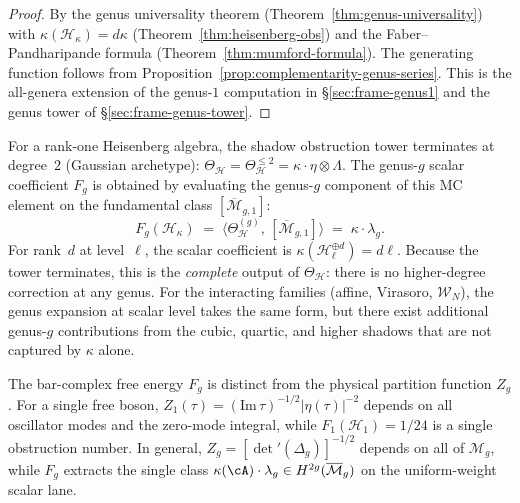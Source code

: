 \begin{proof}
By the genus universality theorem
(Theorem~\ref{thm:genus-universality}) with
$\kappa(\mathcal{H}_\kappa) = d\kappa$
(Theorem~\ref{thm:heisenberg-obs}) and
the Faber--Pandharipande formula
(Theorem~\ref{thm:mumford-formula}).
The generating function follows from
Proposition~\ref{prop:complementarity-genus-series}.
This is the all-genera extension of the genus-$1$ computation in
\S\ref{sec:frame-genus1} and the genus tower of \S\ref{sec:frame-genus-tower}.
\end{proof}

\begin{remark}

For a rank-one Heisenberg algebra, the shadow obstruction tower
terminates at degree~$2$ (Gaussian archetype): $\Theta_{\mathcal{H}} =
\Theta_{\mathcal{H}}^{\leq 2} = \kappa \cdot \eta \otimes \Lambda$.
The genus-$g$ scalar coefficient $F_g$ is obtained by evaluating the genus-$g$
component of this MC element on the fundamental class
$[\overline{\mathcal{M}}_{g,1}]$:
\[
 F_g(\mathcal{H}_\kappa)
 \;=\;
 \bigl\langle \Theta_{\mathcal{H}}^{(g)},\,
 [\overline{\mathcal{M}}_{g,1}] \bigr\rangle
 \;=\;
 \kappa \cdot \lambda_g.
\]
For rank~$d$ at level~$\ell$, the scalar coefficient is
$\kappa(\mathcal H_\ell^{\oplus d})=d\ell$.
Because the tower terminates, this is the \emph{complete} output of
$\Theta_{\mathcal{H}}$: there is no higher-degree correction at any
genus. For the interacting families (affine, Virasoro,
$\mathcal{W}_N$), the genus expansion at scalar level takes the same
form, but there exist additional genus-$g$ contributions from the
cubic, quartic, and higher shadows that are not captured by $\kappa$
alone.
\end{remark}

\begin{remark}
The bar-complex free energy $F_g$ is distinct from the physical
partition function $Z_g$. For a single free boson,
$Z_1(\tau) = (\mathrm{Im}\,\tau)^{-1/2}|\eta(\tau)|^{-2}$
depends on all oscillator modes and the zero-mode integral, while
$F_1(\mathcal{H}_1) = 1/24$ is a single obstruction number. In
general, $Z_g = [\det'(\Delta_g)]^{-1/2}$ depends on all of
$\mathcal{M}_g$, while $F_g$ extracts the single class
$\kappa(\cA) \cdot \lambda_g \in H^{2g}(\overline{\mathcal{M}}_g)$
on the uniform-weight scalar lane.
\end{remark}

